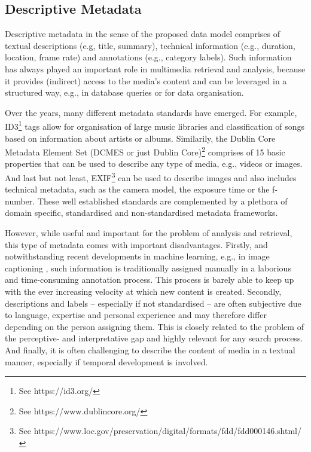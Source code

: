\subsection{Descriptive Metadata}
Descriptive metadata in the sense of the proposed data model comprises of textual descriptions (e.g, title, summary), technical information (e.g., duration, location, frame rate) and annotations (e.g., category labels). Such information has always played an important role in multimedia retrieval and analysis, because it provides (indirect) access to the media's content and can be leveraged in a structured way, e.g., in database queries or for data organisation.

Over the years, many different metadata standards have emerged. For example, ID3\footnote{See https://id3.org/} tags allow for organisation of large music libraries and classification of songs based on information about artists or albums. Similarily, the Dublin Core Metadata Element Set (DCMES or just Dublin Core)\footnote{See https://www.dublincore.org/} comprises of 15 basic properties that can be used to describe any type of media, e.g., videos or images. And last but not least, EXIF\footnote{See https://www.loc.gov/preservation/digital/formats/fdd/fdd000146.shtml/} can be used to describe images and also includes technical metadata, such as the camera model, the exposure time or the f-number. These well established standards are complemented by a plethora of domain specific, standardised and non-standardised metadata frameworks.

However, while useful and important for the problem of analysis and retrieval, this type of metadata comes with important disadvantages. Firstly, and notwithstanding recent developments in machine learning, e.g., in image captioning \cite{Hossain:2019Comprehensive}, such information is traditionally assigned manually in a laborious and time-consuming annotation process. This process is barely able to keep up with the ever increasing velocity at which new content is created. Secondly, descriptions and labels -- especially if not standardised -- are often subjective due to language, expertise and personal experience and may therefore differ depending on the person assigning them. This is closely related to the problem of the perceptive- and interpretative gap \cite{Rossetto:2018thesis} and highly relevant for any search process. And finally, it is often challenging to describe the content of media in a textual manner, especially if temporal development is involved.

